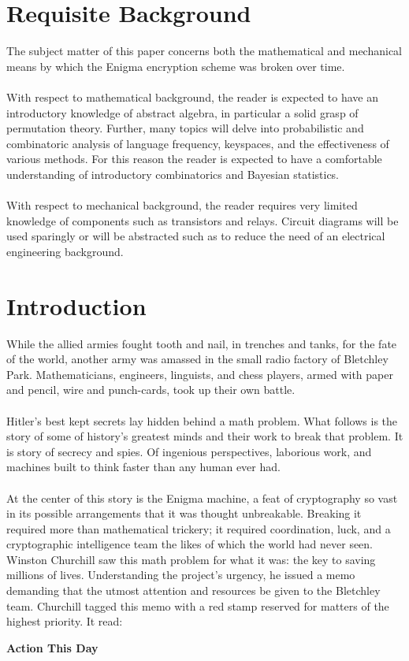 \documentclass{dcthesis}
\theoremstyle{definition}
\theoremstyle{remark}
\begin{document}
\chapter*{Requisite Background}
The subject matter of this paper concerns both the mathematical and mechanical means by which the Enigma encryption scheme was broken over time.
\\\\With respect to mathematical background, the reader is expected to have an introductory knowledge of abstract algebra, in particular a solid grasp of permutation theory. Further, many topics will delve into probabilistic and combinatoric analysis of language frequency, keyspaces, and the effectiveness of various methods. For this reason the reader is expected to have a comfortable understanding of introductory combinatorics and Bayesian statistics.
\\\\With respect to mechanical background, the reader requires very limited knowledge of components such as transistors and relays. Circuit diagrams will be used sparingly or will be abstracted such as to reduce the need of an electrical engineering background.


\chapter*{Introduction}
While the allied armies fought tooth and nail, in trenches and tanks, for the fate of the world, another army was amassed in the small radio factory of Bletchley Park. Mathematicians, engineers, linguists, and chess players, armed with paper and pencil, wire and punch-cards, took up their own battle.
\\\\Hitler's best kept secrets lay hidden behind a math problem. What follows is the story of some of history's greatest minds and their work to break that problem. It is story of secrecy and spies. Of ingenious perspectives, laborious work, and machines built to think faster than any human ever had.
\\\\At the center of this story is the Enigma machine, a feat of cryptography so vast in its possible arrangements that it was thought unbreakable. Breaking it required more than mathematical trickery; it required coordination, luck, and a cryptographic intelligence team the likes of which the world had never seen. Winston Churchill saw this math problem for what it was: the key to saving millions of lives. Understanding the project's urgency, he issued a memo demanding that the utmost attention and resources be given to the Bletchley team. Churchill tagged this memo with a red stamp reserved for matters of the highest priority. It read:
\begin{center}
	\textbf{Action This Day}
\end{center}
\mainmatter



%
\end{document}
